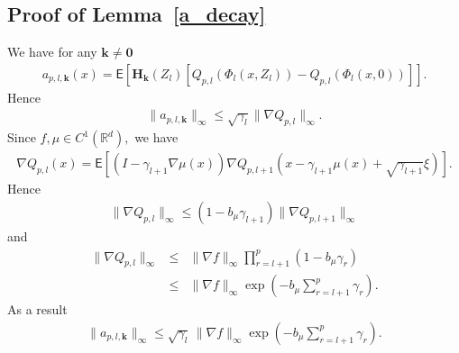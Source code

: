 \documentclass[preprint]{imsart}
\begin{document}
\subsection{Proof of Lemma~\ref{a_decay}}

We have for any \(\mathbf{k}\neq \mathbf{0}\)
\begin{eqnarray*}
a_{p,l,\mathbf{k}}(x)=\mathsf{E}\left[\mathbf{H}_\mathbf{k}\left(Z_l\right)[Q_{p,l}\left(\Phi_l(x,Z_l)\right)-Q_{p,l}\left(\Phi_l(x,0)\right)]\right].
\end{eqnarray*}
Hence
\begin{eqnarray*}
\|a_{p,l,\mathbf{k}}\|_{\infty}\leq \sqrt{\gamma_l}\|\nabla Q_{p,l}\|_{\infty}.
\end{eqnarray*}
Since \(f,\mu\in C^1(\mathbb{R}^d),\)  we have
\begin{eqnarray*}
\nabla Q_{p,l}(x)=\mathsf{E}\left[(I-\gamma_{l+1}\nabla\mu(x))\nabla Q_{p,l+1}(x-\gamma_{l+1}\mu(x)+\sqrt{\gamma_{l+1}}\xi)\right].
\end{eqnarray*}
Hence
\begin{eqnarray*}
\|\nabla Q_{p,l}\|_\infty\leq (1-b_{\mu}\gamma_{l+1})\|\nabla Q_{p,l+1}\|_\infty
\end{eqnarray*}
and
\begin{eqnarray*}
\|\nabla Q_{p,l}\|_\infty&\leq & \|\nabla f\|_\infty\prod_{r=l+1}^p (1-b_{\mu}\gamma_{r})
\\
&\leq & \|\nabla f\|_\infty\exp\left(-b_{\mu}\sum_{r=l+1}^p \gamma_{r}  \right).
\end{eqnarray*}
As a result
\begin{eqnarray*}
\|a_{p,l,\mathbf{k}}\|_{\infty}\leq \sqrt{\gamma_l}\, \|\nabla f\|_\infty\exp\left(-b_{\mu}\sum_{r=l+1}^p \gamma_{r}  \right).
\end{eqnarray*}




\end{document}
